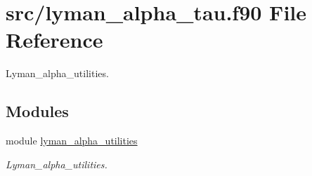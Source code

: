 \hypertarget{lyman__alpha__tau_8f90}{}\section{src/lyman\+\_\+alpha\+\_\+tau.f90 File Reference}
\label{lyman__alpha__tau_8f90}


Lyman\+\_\+alpha\+\_\+utilities.  


\subsection*{Modules}
\begin{DoxyCompactItemize}
\item 
module \hyperlink{namespacelyman__alpha__utilities}{lyman\+\_\+alpha\+\_\+utilities}
\begin{DoxyCompactList}\small\item\em Lyman\+\_\+alpha\+\_\+utilities. \end{DoxyCompactList}\end{DoxyCompactItemize}
